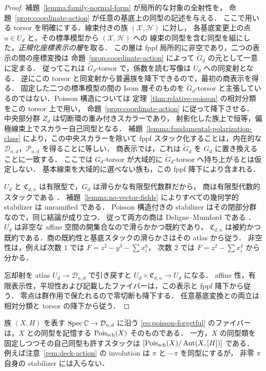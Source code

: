 \begin{proof}
補題~\ref{lemma:family-normal-form} が局所的な対象の全射性を，
命題~\ref{prop:coordinate-action} が任意の基底上の同型の記述を与える．
ここで用いる torsor を明確にする．線束付きの族 $(\mathcal X,\mathcal H)$ に対し，
各基底変更上の点 $u\in U_d$ と，その標準模型から $(\mathcal X,\mathcal H)$ への
線束の同型を含む同型を組にした，\emph{正規化座標表示の層}を取る．
この層は fppf 局所的に非空であり，二つの表示の間の座標変換は
命題~\ref{prop:coordinate-action} によって $\widetilde G_d$ の元として一意に定まる．
従ってこれは $\widetilde G_d$-torsor で，係数を読む写像は $U_d$ への同変射となる．
逆にこの torsor と同変射から普遍族を降下できるので，最初の商表示を得る．
固定した二つの標準模型の間の Isom 層そのものを $\widetilde G_d$-torsor と主張しているのではない．Poisson 構造については
定理~\ref{thm:relative-poisson} の相対分類をこの torsor 上で用い，
命題~\ref{prop:coordinate-action} に従って降下させる．
中央部分群 $Z_d$ は切断環の重み付きスカラーであり，
射影化した族上で恒等，偏極線束上でスカラー自己同型となる．
補題~\ref{lemma:fundamental-polarization-class} により，この中央スカラーを除いて
fppf スタック化することは，内在的な $\mathcal D_{n,d}$，$\mathcal P_{n,d}$ を得ることに等しい．
商表示では，これは $\widetilde G_d$ を $G_d$ に置き換えることに一致する．
ここでは $G_d$-torsor が大域的に $\widetilde G_d$-torsor へ持ち上がるとは仮定しない．
基本線束を大域的に選べない族も，この fppf 降下により含まれる．

$U_d$ と $\mathfrak C_{d,n}$ は有限型で，$G_d$ は滑らかな有限型代数群だから，
商は有限型代数的スタックである \cite[Tag 06FI]{StacksProject}．
補題~\ref{lemma:no-vector-fields} によりすべての幾何学的 stabilizer は unramified である．
Poisson 構造付きの stabilizer はその閉部分群なので，同じ結論が成り立つ．
従って両方の商は Deligne--Mumford である
\cite[Tags 06N3, 0DSL]{StacksProject}．
$U_d$ は非空な affine 空間の開集合なので滑らかかつ既約であり，
$\mathfrak C_{d,n}$ は被約かつ既約である．商の既約性と基底スタックの滑らかさはその atlas から従う．
非空性は，例えば次数 $1$ では $F=z^2-y^3-\sum x_i^6$，
次数 $2$ では $F=z^2-\sum x_i^4$ から分かる．

忘却射を atlas $U_d\to\mathcal D_{n,d}$ で引き戻すと
$U_d\times \mathfrak C_{d,n}\to U_d$ になる．
affine 性，有限表示性，平坦性および記載したファイバーは，この表示と fppf 降下から従う．
零点は群作用で保たれるので零切断も降下する．
任意基底変換との両立は相対分類と torsor の降下から従う．
\end{proof}

\begin{remark}
族 $(X,H)$ を表す $\operatorname{Spec}\mathbb C\to\mathcal D_{n,d}$ に沿う
\eqref{eq:poisson-forgetful} のファイバーは，$X$ との同型を記憶する
$\operatorname{Pois}_{\mathrm{sch}}(X)$ そのものである．
一方，$X$ の同型類を固定しつつその自己同型も許すスタックは
$[\operatorname{Pois}_{\mathrm{sch}}(X)/\operatorname{Aut}(X,[H])]$ である．
例えば注意~\ref{rem:deck-action} の involution は $\pi$ と $-\pi$ を同型にするが，
非零 $\pi$ 自身の stabilizer には入らない．
\end{remark}


